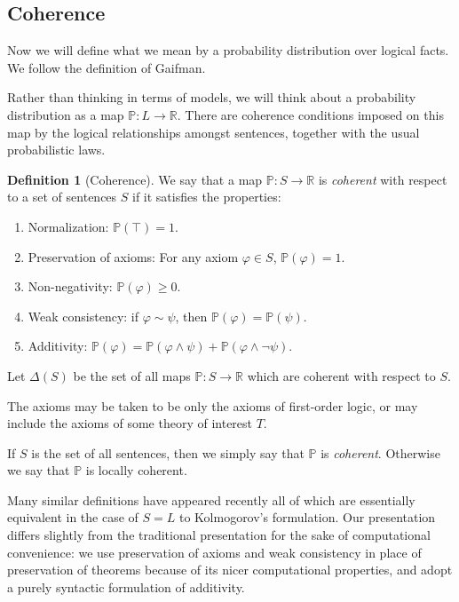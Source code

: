 \documentclass[12pt]{article}
\theoremstyle{definition}
\newtheorem{definition}{Definition}
\newcommand{\RR}{\mathbb{R}}
\newcommand{\of}[1]{\left(#1\right)}
\newcommand{\PP}{\mathbb{P}}
\renewcommand{\P}[1]{\mathbb{P}\of{#1}}
\newcommand{\vp}{\varphi}
\begin{document}
\subsection{Coherence}

Now we will define what we mean by a probability
distribution over logical facts.
We follow the definition of Gaifman\cite{gaifman04}.

Rather than thinking in terms of models,
we will think about a probability distribution as a map 
$\PP : L \rightarrow \RR$.
There are coherence conditions imposed on this map
by the logical relationships amongst sentences,
together with the usual probabilistic laws.
\newcommand{\D}[1]{\Delta\of{#1}}
\begin{definition}[Coherence]
We say that a map $\PP : S \rightarrow \RR$ is \emph{coherent}
with respect to a set of sentences $S$ if it satisfies the properties:
\begin{enumerate}
\item Normalization: $\P{\top} = 1$.
\item Preservation of axioms: For any axiom $\vp \in S$, $\P{\vp} = 1$.
\item Non-negativity: $\P{\vp} \geq 0$.
\item Weak consistency: if $\vp \sim \psi$, then $\P{\vp} = \P{\psi}$.
\item Additivity: $\P{\vp} = \P{\vp \wedge \psi} + \P{\vp \wedge \neg{\psi}}$.
\end{enumerate}
Let $\D{S}$ be the set of all maps $ \PP : S \rightarrow \RR$
which are coherent with respect to $S$.
\end{definition}
The axioms may be taken to be only the axioms of first-order logic,
or may include the axioms of some theory of interest $T$.

If $S$ is the set of all sentences, then we simply say that $\PP$ is \emph{coherent}.
Otherwise we say that $\PP$ is locally coherent.

Many similar definitions have appeared recently %
all of which are essentially equivalent in the case of $S = L$
to Kolmogorov's formulation. %
Our presentation differs slightly from the traditional presentation
for the sake of computational convenience:
we use preservation of axioms and weak consistency in place of preservation
of theorems because of its nicer computational properties,
and adopt a purely syntactic formulation of additivity.
\end{document}
